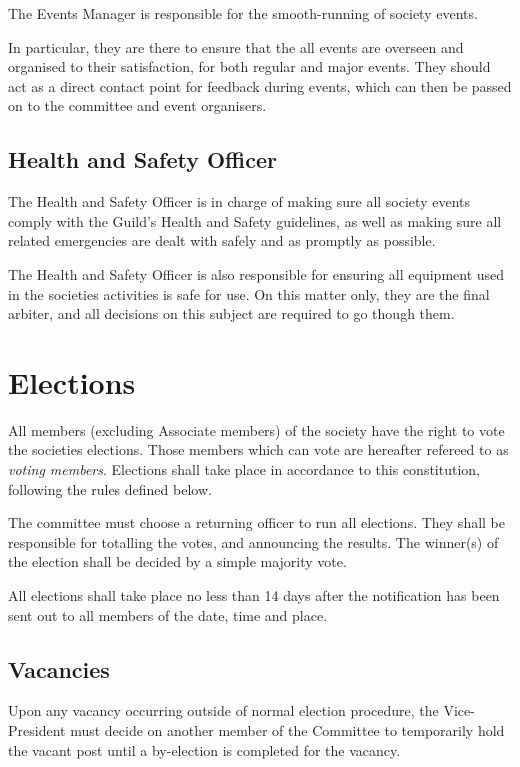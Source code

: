 \documentclass{report}
\begin{document}
	The Events Manager is responsible for the smooth-running of society events.
	
	In particular, they are there to ensure that the all events are overseen and organised to their satisfaction, for both regular and major events. They should act as a direct contact point for feedback during events, which can then be passed on to the committee and event organisers.
	
	\subsection{Health and Safety Officer}
	
	The Health and Safety Officer is in charge of making sure all society events comply with the Guild’s Health and Safety guidelines, as well as making sure all related emergencies are dealt with safely and as promptly as possible.
	
	The Health and Safety Officer is also responsible for ensuring all equipment used in the societies activities is safe for use. On this matter only, they are the final arbiter, and all decisions on this subject are required to go though them.

\newpage
\section{Elections}
\label{elections}

	All members (excluding Associate members) of the society have the right to vote the societies elections. Those members which can vote are hereafter refereed to as {\em voting members}. Elections shall take place in accordance to this constitution, following the rules defined below.
	
	The committee must choose a returning officer to run all elections. They shall be responsible for totalling the votes, and announcing the results. The winner(s) of the election shall be decided by a simple majority vote.
	
	All elections shall take place no less than 14 days after the notification has been sent out to all members of the date, time and place.
	
	\subsection{Vacancies}
	
	Upon any vacancy occurring outside of normal election procedure, the Vice-President must decide on another member of the Committee to temporarily hold the vacant post until a by-election is completed for the vacancy.
	
\end{document}
